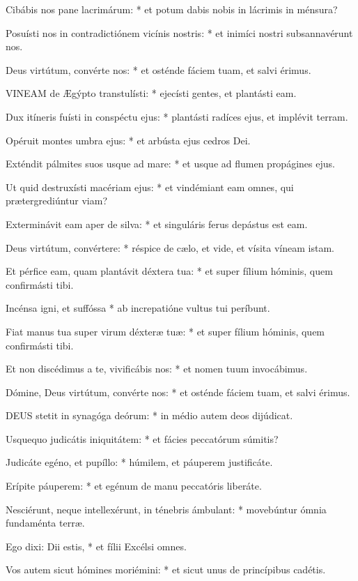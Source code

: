 Cibábis nos pane lacrimárum: * et potum dabis nobis in lácrimis in ménsura?

Posuísti nos in contradictiónem vicínis nostris: * et inimíci nostri subsannavérunt nos.

Deus virtútum, convérte nos: * et osténde fáciem tuam, et salvi érimus.


\lettrine[lines=2]{V}{INEAM} de Ægýpto transtulísti: * ejecísti gentes, et plantásti eam.

Dux itíneris fuísti in conspéctu ejus: * plantásti radíces ejus, et implévit terram.

Opéruit montes umbra ejus: * et arbústa ejus cedros Dei.

Exténdit pálmites suos usque ad mare: * et usque ad flumen propágines ejus.

Ut quid destruxísti macériam ejus: * et vindémiant eam omnes, qui prætergrediúntur viam?

Exterminávit eam aper de silva: * et singuláris ferus depástus est eam.

Deus virtútum, convértere: * réspice de cælo, et vide, et vísita víneam istam.

Et pérfice eam, quam plantávit déxtera tua: * et super fílium hóminis, quem confirmásti tibi.

Incénsa igni, et suffóssa * ab increpatióne vultus tui períbunt.

Fiat manus tua super virum déxteræ tuæ: * et super fílium hóminis, quem confirmásti tibi.

Et non discédimus a te, vivificábis nos: * et nomen tuum invocábimus.

Dómine, Deus virtútum, convérte nos: * et osténde fáciem tuam, et salvi érimus.


\lettrine[lines=2]{D}{EUS} stetit in synagóga deórum: * in médio autem deos dijúdicat.

Usquequo judicátis iniquitátem: * et fácies peccatórum súmitis?

Judicáte egéno, et pupíllo: * húmilem, et páuperem justificáte.

Erípite páuperem: * et egénum de manu peccatóris liberáte.

Nesciérunt, neque intellexérunt, in ténebris ámbulant: * movebúntur ómnia fundaménta terræ.

Ego dixi: Dii estis, * et fílii Excélsi omnes.

Vos autem sicut hómines moriémini: * et sicut unus de princípibus cadétis.

